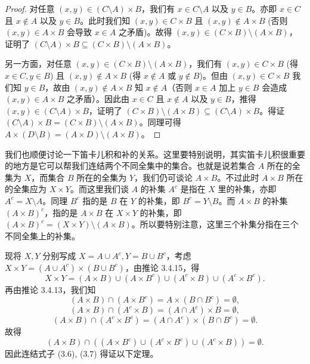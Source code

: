 \begin{proof}
对任意 $(x, y) \in (C \setminus A) \times B$，我们有 $x \in C \setminus A$ 以及 $y \in B$。亦即 $x \in C$ 且 $x \notin A$ 以及 $y \in B$。此时我们知 $(x, y) \in C \times B$ 且 $(x, y) \notin A \times B$ (否则 $(x, y) \in A \times B$ 会导致 $x \in A$ 之矛盾)。故得 $(x, y) \in (C \times B) \setminus (A \times B)$，证明了 $(C \setminus A) \times B \subseteq (C \times B) \setminus (A \times B)$。

另一方面，对任意 $(x, y) \in (C \times B) \setminus (A \times B)$，我们有 $(x, y) \in C \times B$ (得 $x \in C, y \in B$) 且 $(x, y) \notin A \times B$ (得 $x \notin A$ 或 $y \notin B$)。但由 $(x, y) \in C \times B$ 我们知 $y \in B$，故由 $(x, y) \notin A \times B$ 知 $x \notin A$（否则 $x \in A$ 加上 $y \in B$ 会造成 $(x, y) \in A \times B$ 之矛盾）。因此由 $x \in C$ 且 $x \notin A$ 以及 $y \in B$，推得 $(x, y) \in (C \setminus A) \times B$，证明了 $(C \times B) \setminus (A \times B) \subseteq (C \setminus A) \times B$。得证 $(C \setminus A) \times B = (C \times B) \setminus (A \times B)$。同理可得 $A \times (D \setminus B) = (A \times D) \setminus (A \times B)$。
\end{proof}

我们也顺便讨论一下笛卡儿积和补的关系。这里要特别说明，其实笛卡儿积很重要的地方是它可以帮我们连结两个不同全集中的集合。也就是说若集合 $A$ 所在的全集为 $X$，而集合 $B$ 所在的全集为 $Y$，我们仍可谈论 $A \times B$。不过此时 $A \times B$ 所在的全集应为 $X \times Y$。而这里我们谈 $A$ 的补集 $A^c$ 是指在 $X$ 里的补集，亦即 $A^c = X \setminus A$。同理 $B^c$ 指的是 $B$ 在 $Y$ 的补集，即 $B^c = Y \setminus B$。而 $A \times B$ 的补集 $(A \times B)^c$，指的是 $A \times B$ 在 $X \times Y$ 的补集，即 $(A \times B)^c = (X \times Y) \setminus (A \times B)$。所以要特别注意，这里三个补集分指在三个不同全集上的补集。

现将 $X, Y$ 分别写成 $X = A \cup A^c, Y = B \cup B^c$，考虑 $X \times Y = (A \cup A^c) \times (B \cup B^c)$，由推论 3.4.15，得
\begin{equation}
X \times Y = (A \times B) \cup (A \times B^c) \cup (A^c \times B) \cup (A^c \times B^c).
\end{equation}
再由推论 3.4.13，我们知
$$ (A \times B) \cap (A \times B^c) = A \times (B \cap B^c) = \emptyset, $$
$$ (A \times B) \cap (A^c \times B) = (A \cap A^c) \times B = \emptyset, $$
$$ (A \times B) \cap (A^c \times B^c) = (A \cap A^c) \times (B \cap B^c) = \emptyset. $$
故得
\begin{equation}
(A \times B) \cap ((A \times B^c) \cup (A^c \times B^c) \cup (A^c \times B)) = \emptyset.
\end{equation}
因此连结式子 (3.6), (3.7) 得证以下定理。

